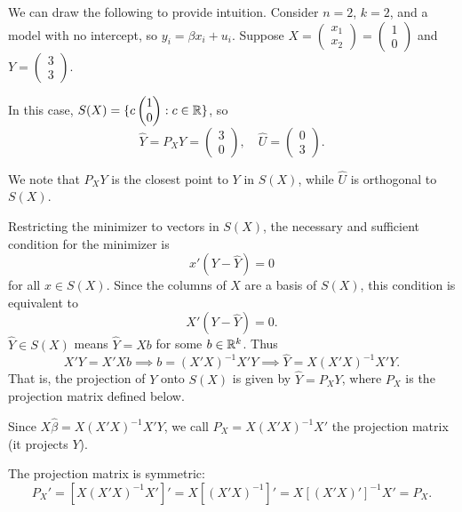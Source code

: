 \begin{example}	We can draw the following to provide intuition. Consider $n=2$, $k=2$, and a model with no intercept, so $y_i = \beta x_i + u_i$. Suppose $X = \begin{pmatrix}
	x_1 \\
	x_2
	\end{pmatrix} = \begin{pmatrix}
	1 \\
	0
	\end{pmatrix} $ and $Y = \begin{pmatrix}
	3 \\
	3
	\end{pmatrix} $.

	In this case, $S(X) = \{c \begin{pmatrix}
	1 \\
	0
	\end{pmatrix} : c\in \mathbb{R}\}$, so \[\hat{Y} = P_X Y = \begin{pmatrix}
	3 \\
	0
	\end{pmatrix}, \quad\hat{U} = \begin{pmatrix}
	0 \\
	3
\end{pmatrix}.\]

	We note that $P_X Y$ is the closest point to $Y$ in $S(X)$, while $\hat{U}$ is orthogonal to $S(X)$.
\end{example}


\begin{remark}	Restricting the minimizer to vectors in $S(X)$, the necessary and sufficient condition for the minimizer is
	\[
		x'(Y-\hat Y)=0
	\]
	for all $x\in S(X)$. Since the columns of $X$ are a basis of $S(X)$, this condition is equivalent to
	\[
		X'(Y-\hat Y)=0.
	\]
	$\hat Y\in S(X)$ means $\hat Y=Xb$ for some $b\in\mathbb{R}^k$. Thus
	\[
		X'Y=X'Xb\implies b=(X'X)^{-1}X'Y\implies\hat Y=X(X'X)^{-1}X'Y.
	\]
	That is, the projection of $Y$ onto $S(X)$ is given by $\hat Y=P_XY$, where $P_X$ is the projection matrix defined below.
\end{remark}

\begin{definition}
	Since $X\hat\beta=X(X'X)^{-1}X'Y$, we call $P_X=X(X'X)^{-1}X'$ the projection matrix (it projects $Y$).

	The projection matrix is symmetric:
	\[
		P_X'=[X(X'X)^{-1}X']'=X[(X'X)^{-1}]'=X[(X'X)']^{-1}X'=P_X.
	\]
\end{definition}

